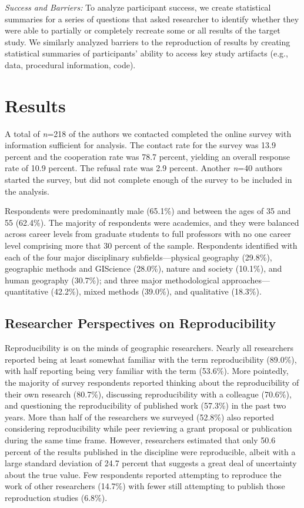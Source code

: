 \documentclass[]{interact}
\theoremstyle{plain}%
\theoremstyle{definition}
\theoremstyle{remark}
\begin{document}
\textit{Success and Barriers:} To analyze participant success, we create statistical summaries for a series of questions that asked researcher to identify whether they were able to partially or completely recreate some or all results of the target study. 
We similarly analyzed barriers to the reproduction of results by creating statistical summaries of participants' ability to access key study artifacts (e.g., data, procedural information, code).

\section*{Results}
A total of \textit{n}=218 of the authors we contacted completed the online survey with information sufficient for analysis. 
The contact rate for the survey was 13.9 percent and the cooperation rate was 78.7 percent, yielding an overall response rate of 10.9 percent. 
The refusal rate was 2.9 percent.
Another \textit{n}=40 authors started the survey, but did not complete enough of the survey to be included in the analysis.

Respondents were predominantly male (65.1\%) and between the ages of 35 and 55 (62.4\%). 
The majority of respondents were academics, and they were balanced across career levels from graduate students to full professors with no one career level comprising more that 30 percent of the sample.
Respondents identified with each of the four major disciplinary subfields---physical geography (29.8\%), geographic methods and GIScience (28.0\%), nature and society (10.1\%), and human geography (30.7\%); and three major methodological approaches---quantitative (42.2\%), mixed methods (39.0\%), and qualitative (18.3\%).

\subsection*{Researcher Perspectives on Reproducibility}
Reproducibility is on the minds of geographic researchers.
Nearly all researchers reported being at least somewhat familiar with the term reproducibility (89.0\%), with half reporting being very familiar with the term (53.6\%).
More pointedly, the majority of survey respondents reported thinking about the reproducibility of their own research (80.7\%), discussing reproducibility with a colleague (70.6\%), and questioning the reproducibility of published work (57.3\%) in the past two years. 
More than half of the researchers we surveyed (52.8\%) also reported considering reproducibility while peer reviewing a grant proposal or publication during the same time frame. 
However, researchers estimated that only 50.6 percent of the results published in the discipline were reproducible, albeit with a large standard deviation of 24.7 percent that suggests a great deal of uncertainty about the true value. 
Few respondents reported attempting to reproduce the work of other researchers (14.7\%) with fewer still attempting to publish those reproduction studies (6.8\%). 
\end{document}
